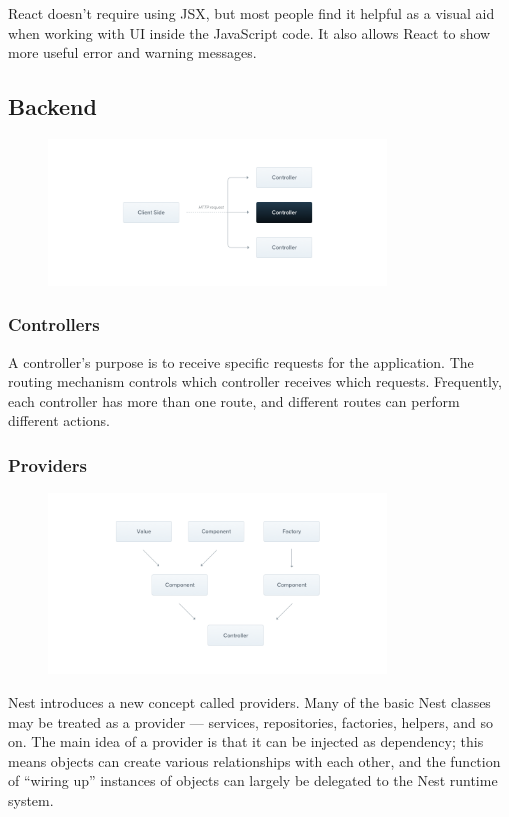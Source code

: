 \documentclass[a4paper]{article}
\numberwithin{equation}{section}
\begin{document}
React doesn’t require using JSX, but most people find it helpful as a visual aid when working with UI inside the JavaScript code. It also allows React to show more useful error and warning messages.

\subsection{Backend}
\begin{figure}[H]
  \centering
  \includegraphics[width=0.8\textwidth]{./assets/p2/Controllers_1.png}
\end{figure}

\subsubsection{Controllers}
A controller's purpose is to receive specific requests for the application.
The routing mechanism controls which controller receives which requests.
Frequently, each controller has more than one route, and different routes can perform different actions.

\subsubsection{Providers}
\begin{figure}[H]
  \centering
  \includegraphics[width=0.8\textwidth]{./assets/p2/Providers_1.png}
\end{figure}

Nest introduces a new concept called providers.
Many of the basic Nest classes may be treated as a provider --- services, repositories, factories, helpers, and so on.
The main idea of a provider is that it can be injected as dependency; this means objects can create various relationships with each other, and the function of ``wiring up'' instances of objects can largely be delegated to the Nest runtime system.
\end{document}
